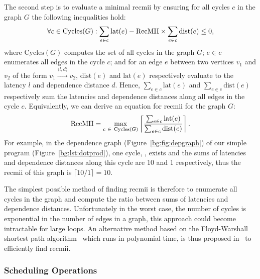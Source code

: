 The second step is to evaluate a minimal \gls{recmii} by ensuring for all
cycles $c$ in the graph $G$ the following inequalities hold:
\begin{equation}
    \forall c \in \mathrm{Cycles}(G):
        \sum_{e \in c} \mathrm{lat}(e) - \mathrm{RecMII} \times
        \sum_{e \in c} \mathrm{dist}(e) \leq 0,
\end{equation}
where $\mathrm{Cycles}(G)$ computes the set of all cycles in the graph $G$;
$e \in c$ enumerates all edges in the cycle $c$; and for an edge $e$ between
two vertices $v_1$ and $v_2$ of the form $v_1 \xrightarrow{\langle l, d
\rangle} v_2$, $\mathrm{dist}(e)$ and $\mathrm{lat}(e)$ respectively evaluate
to the latency $l$ and dependence distance $d$.  Hence, $\sum_{e \in c}
\mathrm{lat}(e)$ and $\sum_{e \in c} \mathrm{dist}(e)$ respectively sum
the latencies and dependence distances along all edges in the cycle $c$.
Equivalently, we can derive an equation for \gls{recmii} for the graph $G$:
\begin{equation}
    \RecMII = \max_{c~\in~\mathrm{Cycles}(G)}
        \left\lceil \frac{%
            \sum_{e \in c} \mathrm{lat}(e)
        }{%
            \sum_{e \in c} \mathrm{dist}(e)
        }
        \right\rceil.
\end{equation}
For example, in the dependence graph (Figure~\ref{bg:fig:depgraph}) of our
simple program (Figure~\ref{bg:lst:dotprod}), one cycle,
,
exists and the sums of latencies and dependence distances along this cycle are
$10$ and $1$ respectively, thus the \gls{recmii} of this graph is $\lceil 10 /
1 \rceil = 10$.

The simplest possible method of finding \gls{recmii} is therefore to enumerate
all cycles in the graph and compute the ratio between sums of latencies
and dependence distances.  Unfortunately in the worst case, the number of
cycles is exponential in the number of edges in a graph, this approach could
become intractable for large loops.  An alternative method based on the
Floyd-Warshall shortest path algorithm~\cite{floyd62} which runs in polynomial
time, is thus proposed in~\cite{rau94} to efficiently find \gls{recmii}.

\subsubsection{Scheduling Operations}

